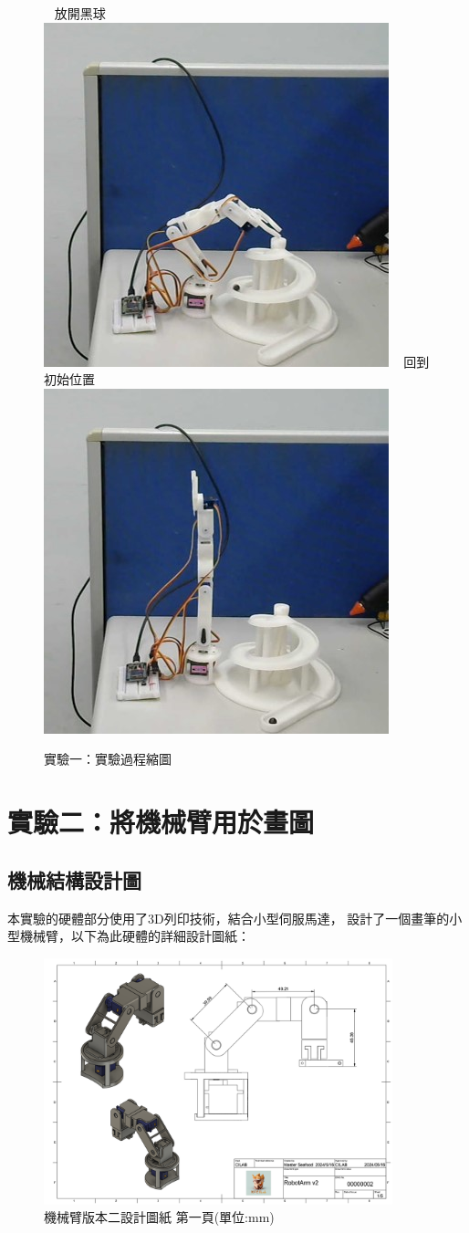 \documentclass[class=NCU_thesis, crop=false]{standalone}
\begin{document}
\begin{figure}[h]
    ~    
    \subcaptionbox
        {放開黑球
        \label{fig:fig-dataset-contrast-after-adjustment}}
        {\includegraphics[width=0.4\linewidth]{figures/TB (5).jpg}}
    ~
    \subcaptionbox
        {回到初始位置
        \label{fig:fig-dataset-contrast-after-adjustment}}
        {\includegraphics[width=0.4\linewidth]{figures/TB (6).jpg}}   
\caption{實驗一：實驗過程縮圖}
\end{figure}

\section{實驗二：將機械臂用於畫圖}
\subsection{機械結構設計圖}
本實驗的硬體部分使用了3D列印技術，結合小型伺服馬達，
設計了一個畫筆的小型機械臂，以下為此硬體的詳細設計圖紙：
\begin{figure}[htbp]
    \centering
    \includegraphics[width=0.9\textwidth]{figures/Armv2 (1).PNG}
    \caption{機械臂版本二設計圖紙 第一頁(單位:mm)}
\end{figure}
\end{document}
